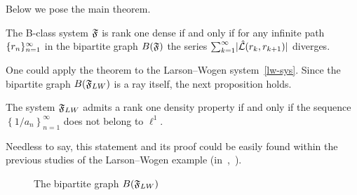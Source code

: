 \documentclass[12pt]{amsart}
\begin{document}
    \bigskip
    Below we pose the main theorem.
    \begin{theorem}
      \label{thm-main}
      The B-class system $\mathfrak{F}$ is rank one dense if and only if
        for any infinite path $\{{r}_n\}_{n=1}^\infty$ in the bipartite graph $B(\mathfrak{F})$
          the series $\sum_{k=1}^\infty\lvert\hat{\mathcal{L}}(r_k, r_{k+1})\rvert$ diverges.
    \end{theorem}
    \begin{remark}
      One could apply the theorem to the Larson--Wogen system~\eqref{lw-sys}.
      Since the bipartite graph $B(\mathfrak{F}_{LW})$ is a ray itself, the next proposition holds.
      \begin{corol*}
          The system $\mathfrak{F}_{LW}$ admits a rank one density property if and only if
            the sequence $\left\{1/a_n\right\}_{n=1}^\infty$ does not belong to $\ell^1$.
      \end{corol*}
      Needless to say, this statement and its proof could be easily found within the previous studies of the Larson--Wogen example (in~\cite{katavolos},~\cite{larson}).
    \end{remark}
    \begin{figure}
      \begin{center}
      \caption{The bipartite graph $B(\mathfrak{F}_{LW})$ } \label{lw-bgraph}
      \end{center}
    \end{figure}
\end{document}
